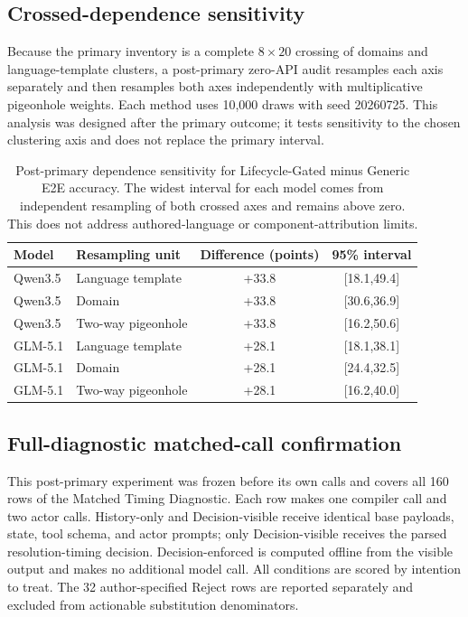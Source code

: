 \documentclass[10pt]{article}
\begin{document}
\subsection{Crossed-dependence sensitivity}
Because the primary inventory is a complete $8\times20$ crossing of domains and language-template
clusters, a post-primary zero-API audit resamples each axis separately and then resamples both axes
independently with multiplicative pigeonhole weights. Each method uses 10,000 draws with seed
20260725. This analysis was designed after the primary outcome; it tests sensitivity to the chosen
clustering axis and does not replace the primary interval.

\begin{table}[h]
\centering
\small
\begin{tabular}{llcc}
\toprule
Model & Resampling unit & Difference (points) & 95\% interval \\
\midrule
Qwen3.5 & Language template & +33.8 & [18.1,49.4] \\
Qwen3.5 & Domain & +33.8 & [30.6,36.9] \\
Qwen3.5 & Two-way pigeonhole & +33.8 & [16.2,50.6] \\
GLM-5.1 & Language template & +28.1 & [18.1,38.1] \\
GLM-5.1 & Domain & +28.1 & [24.4,32.5] \\
GLM-5.1 & Two-way pigeonhole & +28.1 & [16.2,40.0] \\
\bottomrule
\end{tabular}
\caption{Post-primary dependence sensitivity for Lifecycle-Gated minus Generic E2E accuracy.
The widest interval for each model comes from independent resampling of both crossed axes and
remains above zero. This does not address authored-language or component-attribution limits.}
\label{tab:supp-crossed-bootstrap}
\end{table}

\FloatBarrier

\subsection{Full-diagnostic matched-call confirmation}
This post-primary experiment was frozen before its own calls and covers all 160 rows of the
Matched Timing Diagnostic. Each row makes one compiler call and two actor calls. History-only and
Decision-visible receive identical base payloads, state, tool schema, and actor prompts; only
Decision-visible receives the parsed resolution-timing decision. Decision-enforced is computed
offline from the visible output and makes no additional model call. All conditions are scored by
intention to treat. The 32 author-specified Reject rows are reported separately and excluded from
actionable substitution denominators.
\end{document}
